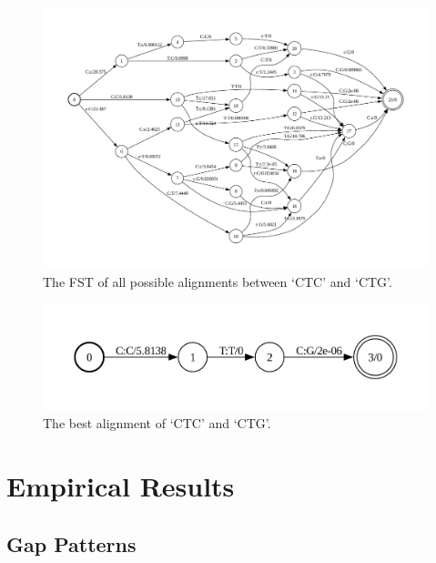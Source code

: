 \documentclass[
]{article}
\begin{document}
\begin{figure}

{\centering \includegraphics{figures/aln-example-graph} 

}

\caption{The FST of all possible alignments between `CTC' and `CTG'.}\label{fig:aln-example-a}
\end{figure}

\begin{figure}

{\centering \includegraphics[width=0.75\linewidth]{figures/aln-example-path} 

}

\caption{The best alignment of `CTC' and `CTG'.}\label{fig:aln-example-b}
\end{figure}

\newpage

\hypertarget{empirical-results}{%
\section{Empirical Results}\label{empirical-results}}

\hypertarget{gap-patterns}{%
\subsection{Gap Patterns}\label{gap-patterns}}
\end{document}

